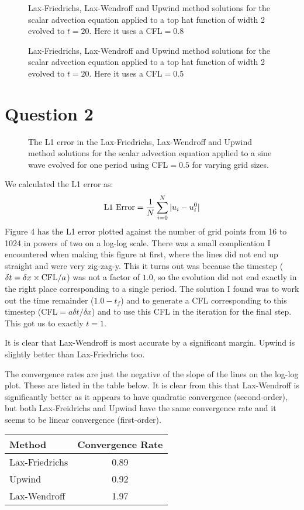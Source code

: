 \documentclass[11pt]{article}
\begin{document}
\begin{figure}
  \centering

  \caption{Lax-Friedrichs, Lax-Wendroff and Upwind method solutions for the scalar advection equation applied to a top hat function of width 2 evolved to $t=20$. Here it uses a CFL$=0.8$}
  \label{multigrid-plot}
\end{figure}

\begin{figure}
  \centering

  \caption{Lax-Friedrichs, Lax-Wendroff and Upwind method solutions for the scalar advection equation applied to a top hat function of width 2 evolved to $t=20$. Here it uses a CFL$=0.5$}
  \label{multigrid-plot}
\end{figure}


\section{Question 2}

\begin{figure}
  \centering

  \caption{The L1 error in the Lax-Friedrichs, Lax-Wendroff and Upwind method solutions for the scalar advection equation applied to a sine wave evolved for one period using CFL$=0.5$ for varying grid sizes.}
  \label{multigrid-plot}
\end{figure}
We calculated the L1 error as:
\begin{eqnarray}
	\textnormal{L1 Error} = \frac{1}{N} \sum_{i=0}^N |u_i - u_i^0|
\end{eqnarray}
Figure 4 has the L1 error plotted against the number of grid points from 16 to 1024 in powers of two on a log-log scale. There was a small complication I encountered when making this figure at first, where the lines did not end up straight and were very zig-zag-y. This it turns out was because the timestep ($\delta t = \delta x \times\textnormal{CFL} / a$) was not a factor of $1.0$, so the evolution did not end exactly in the right place corresponding to a single period. The solution I found was to work out the time remainder ($1.0 - t_f$) and to generate a CFL corresponding to this timestep (CFL$= a \delta t / \delta x$) and to use this CFL in the iteration for the final step. This got us to exactly $t=1$.

It is clear that Lax-Wendroff is most accurate by a significant margin. Upwind is slightly better than Lax-Friedrichs too.

The convergence rates are just the negative of the slope of the lines on the log-log plot. These are listed in the table below. It is clear from this that Lax-Wendroff is significantly better as it appears to have quadratic convergence (second-order), but both Lax-Freidrichs and Upwind have the same convergence rate and it seems to be linear convergence (first-order).

\begin{center}
\begin{tabular}{|l |c|}
\hline
Method & Convergence Rate \\
\hline
	Lax-Friedrichs & 0.89 \\
	Upwind & 0.92 \\
	Lax-Wendroff & 1.97 \\
\hline
\end{tabular}
\end{center}
\end{document}
